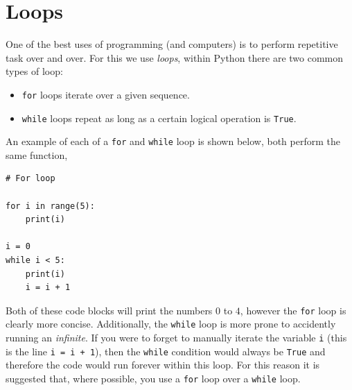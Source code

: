 \documentclass[a4paper]{article}
\begin{document}
\begin{center}
	\noindent{}
\end{center}

\section{Loops}

One of the best uses of programming (and computers) is to perform repetitive task over and over.
For this we use \emph{loops}, within Python there are two common types of loop:
\begin{itemize}
	\item{\texttt{for} loops iterate over a given sequence.}
	\item{\texttt{while} loops repeat as long as a certain logical operation is \texttt{True}.}
\end{itemize}
An example of each of a \texttt{for} and \texttt{while} loop is shown below, both perform the same function,
\begin{lstlisting}
# For loop

for i in range(5):
	print(i)

i = 0
while i < 5:
	print(i)
	i = i + 1
\end{lstlisting}
Both of these code blocks will print the numbers $0$ to $4$, however the \texttt{for} loop is clearly more concise.
Additionally, the \texttt{while} loop is more prone to accidently running an \emph{infinite}.
If you were to forget to manually iterate the variable \texttt{i} (this is the line \texttt{i = i + 1}), then the \texttt{while} condition would always be \texttt{True} and therefore the code would run forever within this loop.
For this reason it is suggested that, where possible, you use a \texttt{for} loop over a \texttt{while} loop.
\end{document}

